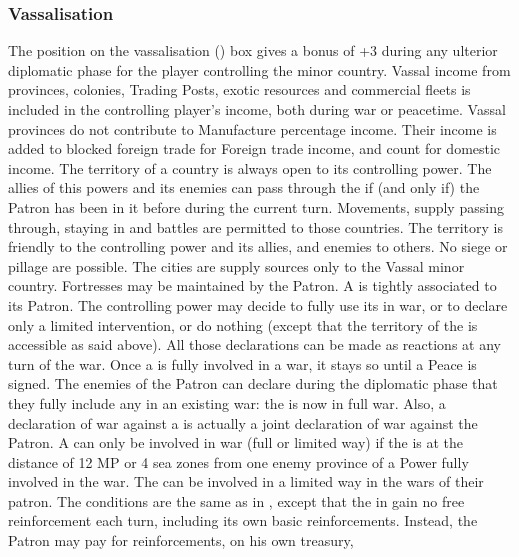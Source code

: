 \subsubsection{Vassalisation}
\aparag The position on the vassalisation (\VASSAL) box gives a bonus of +3
during any ulterior diplomatic phase for the player controlling the minor
country.
\aparag[Income]
Vassal income from provinces, colonies, Trading Posts, exotic resources and
commercial fleets is included in the controlling player's income, both during
war or peacetime.
\bparag Vassal provinces do not contribute to Manufacture percentage income.
\bparag Their income is added to blocked foreign trade for Foreign trade
income, and count for domestic income.
\aparag The territory of a \VASSAL country is always open to its controlling
power. The allies of this powers and its enemies can pass through the \VASSAL
if (and only if) the Patron has been in it before during the current turn.
\bparag Movements, supply passing through, staying in and battles are
permitted to those countries. The territory is friendly to the controlling
power and its allies, and enemies to others.
\bparag No siege or pillage are possible. The cities are supply sources only
to the Vassal minor country.
\bparag Fortresses may be maintained by the Patron.
\aparag[Alliance.]
A \VASSAL is tightly associated to its Patron.
\bparag The controlling power may decide to fully use its \VASSAL in war, or
to declare only a limited intervention, or do nothing (except that the
territory of the \VASSAL is accessible as said above). All those declarations
can be made as reactions at any turn of the war. Once a \VASSAL is fully
involved in a war, it stays so until a Peace is signed.
\bparag The enemies of the Patron can declare during the diplomatic phase that
they fully include any \VASSAL in an existing war: the \VASSAL is now in full
war.  Also, a declaration of war against a \VASSAL is actually a joint
declaration of war against the Patron.
\bparag A \VASSAL can only be involved in war (full or limited way) if the
\VASSAL is at the distance of 12 MP or 4 sea zones from one enemy province of
a Power fully involved in the war.
The \VASSAL can be involved in a limited way in the wars of their patron. The
conditions are the same as in \AM, except that the \MIN in \VASSAL gain no
free reinforcement each turn, including its own basic reinforcements.
\bparag Instead, the Patron may pay for reinforcements, on his own treasury,

